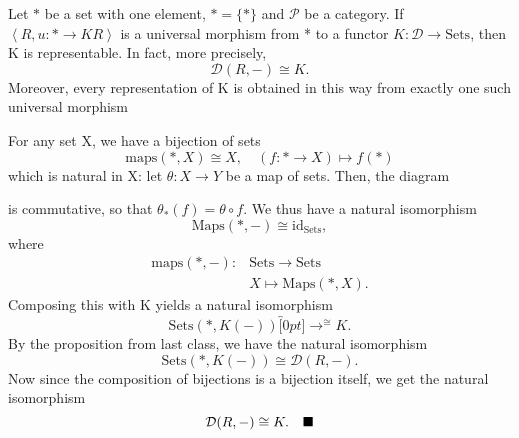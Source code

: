 \documentclass[../category_theory.tex]{subfiles}
\begin{document}
\begin{prop*}
	Let \(*\) be a set with one element, \(*=\{*\}\) and \(\mathcal{P}\) be a category. If \(\left< R, u:*\rightarrow KR \right>\) is a universal morphism from * to a functor \(K:\mathcal{D}\rightarrow \mathrm{Sets}\), then K is representable. In fact, more precisely,
	\[
		\mathcal{D}(R, -)\cong K.
	\]
	Moreover, every representation of K is obtained in this way from exactly one such universal morphism
\end{prop*}
\begin{proof*}
	For any set X, we have a bijection of sets
	\[
		\text{maps}(*, X) \cong X,\quad (f:*\rightarrow X)\mapsto f(*)
	\]
	which is natural in X: let \(\theta : X\rightarrow Y\) be a map of sets. Then, the diagram
	\begin{center}
	\end{center}
	is commutative, so that \(\theta_{*}(f)=\theta \circ f\). We thus have a natural isomorphism
	\[
		\text{Maps}(*, -)\cong \mathrm{id}_{\mathrm{Sets}},
	\]
	where
	\begin{align*}
		\text{maps}(*, -): & \mathrm{Sets}\rightarrow \mathrm{Sets} \\
		                   & X\mapsto \text{Maps}(*, X).
	\end{align*}
	Composing this with K yields a natural isomorphism
	\[
		\mathrm{Sets}(*, K(-))\overbracket[0pt]{\longrightarrow}^{\cong }K.
	\]
	By the proposition from last class, we have the natural isomorphism
	\[
		\mathrm{Sets}(*, K(-))\cong \mathcal{D}(R, -).
	\]
	Now since the composition of bijections is a bijection itself, we get the natural isomorphism
	\[
		\mathcal{D}(R, -)\cong K.\quad \text{$\blacksquare$}
	\]
\end{proof*}
\end{document}
